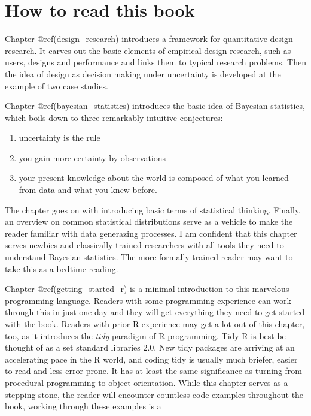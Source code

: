 \documentclass[]{svmono}
\providecommand{\tightlist}{%
  \setlength{\itemsep}{0pt}\setlength{\parskip}{0pt}}
\begin{document}
\section{How to read this book}\label{how-to-read-this-book}

Chapter @ref(design\_research) introduces a framework for quantitative
design research. It carves out the basic elements of empirical design
research, such as users, designs and performance and links them to
typical research problems. Then the idea of design as decision making
under uncertainty is developed at the example of two case studies.

Chapter @ref(bayesian\_statistics) introduces the basic idea of Bayesian
statistics, which boils down to three remarkably intuitive conjectures:

\begin{enumerate}
\def\labelenumi{\arabic{enumi}.}
\tightlist
\item
  uncertainty is the rule
\item
  you gain more certainty by observations
\item
  your present knowledge about the world is composed of what you learned
  from data and what you knew before.
\end{enumerate}

The chapter goes on with introducing basic terms of statistical
thinking. Finally, an overview on common statistical distributions serve
as a vehicle to make the reader familiar with data generazing processes.
I am confident that this chapter serves newbies and classically trained
researchers with all tools they need to understand Bayesian statistics.
The more formally trained reader may want to take this as a bedtime
reading.

Chapter @ref(getting\_started\_r) is a minimal introduction to this
marvelous programming language. Readers with some programming experience
can work through this in just one day and they will get everything they
need to get started with the book. Readers with prior R experience may
get a lot out of this chapter, too, as it introduces the \emph{tidy}
paradigm of R programming. Tidy R is best be thought of as a set
standard libraries 2.0. New tidy packages are arriving at an
accelerating pace in the R world, and coding tidy is usually much
briefer, easier to read and less error prone. It has at least the same
significance as turning from procedural programming to object
orientation. While this chapter serves as a stepping stone, the reader
will encounter countless code examples throughout the book, working
through these examples is a
\end{document}
